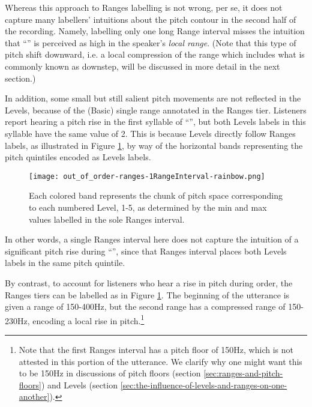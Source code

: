 Whereas this approach to Ranges labelling is not wrong, per se, it does not capture many labellers’ intuitions about the pitch contour in the second half of the recording. Namely, labelling only one long Range interval misses the intuition that “” is perceived as high in the speaker’s \emph{local range}. (Note that this type of pitch shift downward, i.e. a local compression of the range which includes what is commonly known as downstep, will be discussed in more detail in the next section.)

In addition, some small but still salient pitch movements are not reflected in the Levels, because of the (Basic) single range annotated in the Ranges tier. Listeners report hearing a pitch rise in the first syllable of “”, but both Levels labels in this syllable have the same value of 2. This is because Levels directly follow Ranges labels, as illustrated in Figure \ref{fig:out_of_order-ranges rainbow Ranges Adv}, by way of the horizontal bands representing the pitch quintiles encoded as Levels labels.

\begin{figure}[H]
\centering
%
\texttt{[image: out\_of\_order-ranges-1RangeInterval-rainbow.png]}
%
\caption[Each colored band represents the chunk of pitch space corresponding to each numbered Level, 1-5.]{Each colored band represents the chunk of pitch space corresponding to each numbered Level, 1-5, as determined by the min and max values labelled in the sole Ranges interval.%
\label{fig:out_of_order-ranges rainbow Ranges Adv}%
}
\end{figure}

In other words, a single Ranges interval here does not capture the intuition of a significant pitch rise during “”, since that Ranges interval places both Levels labels in the same pitch quintile.

By contrast, to account for listeners who hear a rise in pitch during order, the Ranges tiers can be labelled as in Figure \ref{fig:out_of_order-ranges rainbow Ranges Adv}. The beginning of the utterance is given a range of 150-400Hz, but the second range has a compressed range of 150-230Hz, encoding a local rise in pitch.\footnote{Note that the first Ranges interval has a pitch floor of 150Hz, which is not attested in this portion of the utterance. We clarify why one might want this to be 150Hz in discussions of pitch floors (section \ref{sec:ranges-and-pitch-floors}) and Levels (section \ref{sec:the-influence-of-levels-and-ranges-on-one-another}).}

